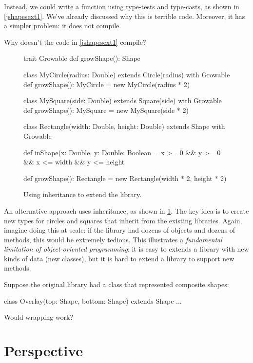 \documentclass[9pt]{extbook}
\begin{document}
Instead, we could write a  function using
type-tests and type-casts, as shown in \cref{jshapesext1}. We've already
discussed why this is terrible code. Moreover, it has a simpler problem: it
does not compile.

\begin{think}
Why doesn't the code in \cref{jshapesext1} compile?
\end{think}

\begin{figure}
\begin{scalacode}
trait Growable {
  def growShape(): Shape
}

class MyCircle(radius: Double) extends Circle(radius) with Growable {
  def growShape(): MyCircle = new MyCircle(radius * 2)
}

class MySquare(side: Double) extends Square(side) with Growable {
  def growShape(): MySquare = new MySquare(side * 2)
}

class Rectangle(width: Double, height: Double) extends Shape with Growable {
  def inShape(x: Double, y: Double: Boolean = x >= 0 && y >= 0 && x <= width && y <= height

  def growShape(): Rectangle = new Rectangle(width * 2, height * 2)
}
\end{scalacode}
\caption{Using inheritance to extend the library.}
\label{jshapesext2}
\end{figure}

An alternative approach uses inheritance, as shown
in \cref{jshapesext2}. The key idea is to create  new types for circles
and squares that inherit from the existing libraries.
Again, imagine doing this at scale: if the library had dozens of objects
and dozens of methods, this would be extremely tedious.
 This illustrates a \emph{fundamental limitation of
object-oriented programming}: it is easy to extends a library with new
kinds of data (new classes), but it is hard to extend a library to support
new methods.

\begin{think}
Suppose the original library had a class that represented composite
shapes:
\begin{scalacode}
class Overlay(top: Shape, bottom: Shape) extends Shape { ... }
\end{scalacode}
Would wrapping work?
\end{think}

\section{Perspective}
\end{document}
